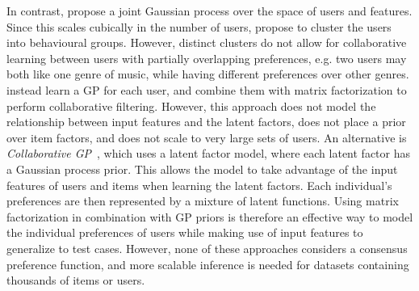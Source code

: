 In contrast, \citet{guo2010gaussian} propose a joint Gaussian process over the
space of users and features. Since this scales cubically
in the number of users, \citet{abbasnejad2013learning} 
propose to cluster the users into behavioural groups.
However, distinct clusters do not
allow for collaborative learning between users with partially overlapping preferences, e.g. two users may both like one genre of music, 
while having different preferences over other genres. 
\citet{khan2014scalable} instead learn a GP for each user,
and combine them with matrix factorization to perform collaborative filtering.
However, this approach does not model the relationship between
 input features and the latent factors, does not place a prior over item factors,
 and does not scale to very large sets of users.
An alternative is \emph{Collaborative GP}~\citep{houlsby2012collaborative},
which uses a latent factor model, where each latent factor has a Gaussian process prior. 
This allows the model to take advantage of the input features of
users and items when learning the latent factors. 
Each individual's preferences are then represented 
by a mixture of latent functions.
Using matrix factorization in combination with GP priors is therefore an effective
way to model the individual preferences of users while
making use of input features to generalize to test cases. However,
none of these approaches considers a consensus preference function, and
more scalable inference is needed for datasets containing thousands of items or users.

